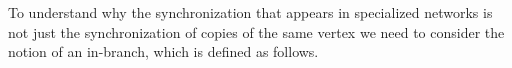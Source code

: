 \documentclass[12pt]{thesis}
\begin{document}




To understand why the synchronization that appears in specialized networks is not just the synchronization of copies of the same vertex we need to consider the notion of an {in-branch}, which is defined as follows.
\end{document}
